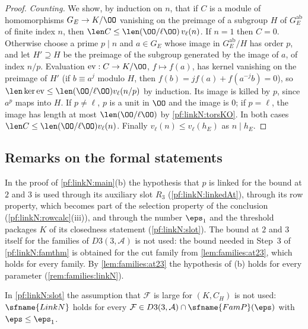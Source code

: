 \begin{proof}
\emph{Counting.} We show, by induction on $n$, that if $C$ is a module of homomorphisms $G_E\to K/\OO$ vanishing on the preimage of a subgroup
$H$ of $G_E^{\mathrm{ab}}$ of finite index $n$, then $\len C\le\len(\OO/\ell\OO)\,v_\ell(n)$. If $n=1$ then $C=0$. Otherwise choose a prime
$p\mid n$ and $a\in G_E$ whose image in $G_E^{\mathrm{ab}}/H$ has order $p$, and let $H'\supseteq H$ be the preimage of the subgroup generated by
the image of $a$, of index $n/p$. Evaluation $\mathrm{ev}:C\to K/\OO$, $f\mapsto f(a)$, has kernel vanishing on the preimage of $H'$ (if $b\equiv a^j$
modulo $H$, then $f(b)=jf(a)+f(a^{-j}b)=0$), so $\len\ker\mathrm{ev}\le\len(\OO/\ell\OO)v_\ell(n/p)$ by induction. Its image is killed by $p$,
since $a^p$ maps into $H$. If $p\ne\ell$, $p$ is a unit in $\OO$ and the image is $0$; if $p=\ell$, the image has length at most
$\len(\OO/\ell\OO)$ by \cref{pf:linkN:torsKO}. In both cases $\len C\le\len(\OO/\ell\OO)v_\ell(n)$. Finally $v_\ell(n)\le v_\ell(h_E)$ as $n\mid h_E$.
\end{proof}

\subsection{Remarks on the formal statements}\label{sec:pf:linkN:remarks}

\begin{remark}\label{pf:linkN:remhyp}
In the proof of \cref{pf:linkN:main}(b) the hypothesis that $p$ is linked for the bound at $2$ and $3$ is used through its auxiliary
slot $R_3$ (\cref{pf:linkN:linkedAt}), through its row property, which becomes part of the selection property of the conclusion
(\cref{pf:linkN:rowcalc}(iii)), and through the number $\eps_1$ and the threshold packages $K$ of its closedness statement
(\cref{pf:linkN:slot}). The bound at $2$ and $3$ itself for the families of $D3(3,\mathcal A)$ is not used: the bound needed in Step~3
of \cref{pf:linkN:famthm} is obtained for the cut family from \cref{lem:families:at23}, which holds for every family. By
\cref{lem:families:at23} the hypothesis of (b) holds for every parameter (\cref{rem:families:linkN}).
\end{remark}

\begin{remark}[Largeness]\label{pf:linkN:remlarge}
In \cref{pf:linkN:slot} the assumption that $\mathcal F$ is large for $(K,C_H)$ is not used: $\sfname{LinkN}$ holds for every
$\mathcal F\in D3(3,\mathcal A)\cap\sfname{FamP}(\eps)$ with $\eps\le\eps_1$.
\end{remark}

